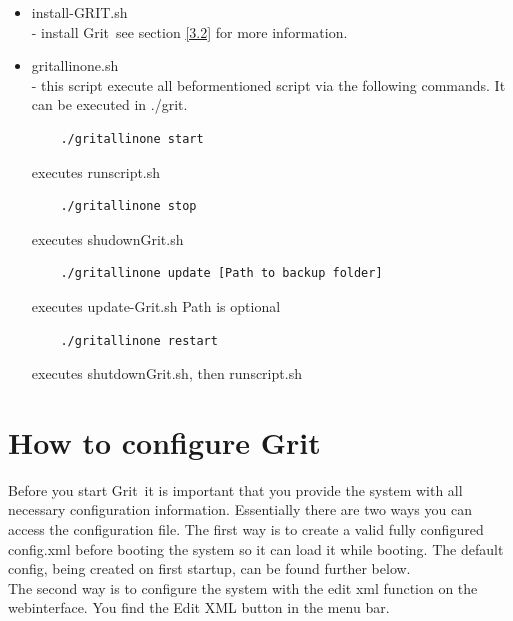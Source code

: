 \documentclass[10pt,a4paper, titlepage, toc=idx]{scrreprt}
\theoremstyle{definition}
\theoremstyle{plain}
\newcommand*{\product}{Grit}
\begin{document}
\begin{itemize}
\noindent \textbf{Warning: }If \product\ is updated the source code has to recompile. In the process all temp directories such as wdir/, res/web/pdf or config/ will be deleted. The update-Grit tries to ensure via the backup that \product\ goes back into the state before the update by copying the data from the backup folder into the respective folders. However, further testing has to be done to ensure that preupdate and postupdate states are equal.

\item install-GRIT.sh\\
		- install \product\ see section \ref{3.2} for more information.
\item gritallinone.sh\\
		- this script execute all beformentioned script via the following commands. It can be executed in ./grit.
\begin{lstlisting}
	./gritallinone start
\end{lstlisting}
executes runscript.sh
\begin{lstlisting}
	./gritallinone stop
\end{lstlisting}
executes shudownGrit.sh
\begin{lstlisting}
	./gritallinone update [Path to backup folder]
\end{lstlisting}
executes update-Grit.sh Path is optional
\begin{lstlisting}
	./gritallinone restart
\end{lstlisting}
executes shutdownGrit.sh, then runscript.sh
\end{itemize}
	
\section{How to configure Grit}\label{config}
    
Before you start \product\ it is important that you provide the system with all necessary configuration information. Essentially there are two ways you can access the configuration file. The first way is to create a valid fully configured config.xml before booting the system so it can load it while booting. The default config, being created on  first startup, can be found further below.\\

The second way is to configure the system with the edit xml function on the webinterface. You find the Edit XML button in the menu bar. \\
\end{document}
